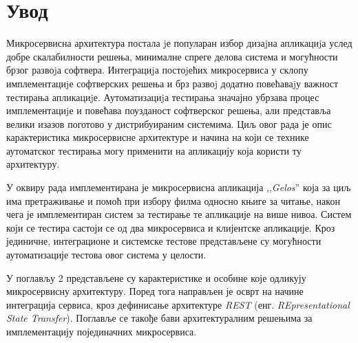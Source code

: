 \documentclass[12pt,oneside]{memoir}
\begin{document}
\frontmatter
\naslovna
\komisija
\apstrakt
\tableofcontents*

\mainmatter

\chapter{Увод}

Микросервисна архитектура постала jе популаран избор дизаjна апликациjа услед добре скалабилности решења, минималне спреге делова система и могућности брзог развоjа софтвера. Интеграциjа постоjећих микросервиса у склопу имплементациjе софтверских решења и брз развоj додатно повећаваjу важност тестирања апликациjе.
Аутоматизациjа тестирања значајно  убрзава процес имплементациjе и повећава поузданост софтверског решења, али представља велики изазов поготово у дистрибуираним системима. Циљ овог рада је опис карактеристика микросервисне архитектуре и начина на који се технике аутоматског тестирања могу применити на апликацију која користи ту архитектуру.

У оквиру рада имплементирана је микросервисна апликација ,,\textit{Gelos}” која за циљ има претраживање и помоћ при избору филма односно књиге за читање, након чега је имплементиран систем за тестирање те апликације на више нивоа. Систем који се тестира састоји се од два микросервиса и клијентске апликације. Кроз јединичне, интеграционе и системске тестове представљене су могућности аутоматизације тестова овог система у целости.

У поглављу 2 представљене су карактеристике и особине које одликују микросервисну архитектуру. Поред тога направљен је осврт на начине интеграција сервиса, кроз дефинисање архитектуре \textit{REST} (енг. \textit{REpresentational State Transfer}). Поглавље се такође бави архитектуралним решењима за имплементацију појединачних микросервиса.
\end{document}
